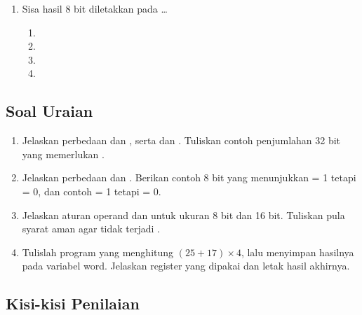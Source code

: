 \begin{enumerate}
    \item Sisa hasil  8 bit diletakkan pada \dots
          \begin{enumerate}
              \item {} \item {}
              \item {} \item {}
          \end{enumerate}
\end{enumerate}

\subsection{Soal Uraian}

\begin{enumerate}
    \item Jelaskan perbedaan  dan , serta
           dan . Tuliskan contoh penjumlahan
          32 bit yang memerlukan .

    \item Jelaskan perbedaan  dan . Berikan
          contoh 8 bit yang menunjukkan  = 1 tetapi
           = 0, dan contoh  = 1 tetapi
           = 0.

    \item Jelaskan aturan operand  dan  untuk
          ukuran 8 bit dan 16 bit. Tuliskan pula syarat aman agar
          tidak terjadi .

    \item Tulislah program yang menghitung $(25 + 17) \times 4$,
          lalu menyimpan hasilnya pada variabel word. Jelaskan
          register yang dipakai dan letak hasil akhirnya.
\end{enumerate}

\subsection{Kisi-kisi Penilaian}

